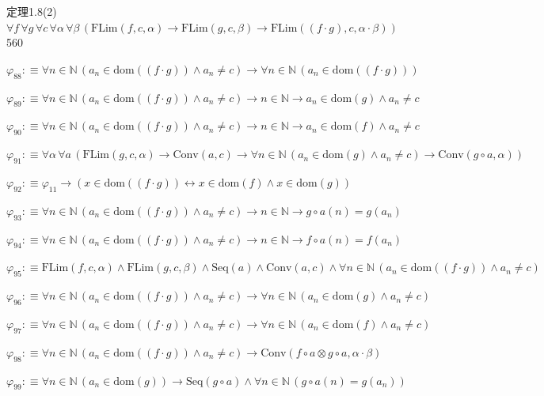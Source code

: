 \begin{fullproof}{定理1.8(2)}{$\forall f\,\forall g\,\forall c\,\forall \alpha\,\forall \beta\,(\mathrm{FLim}(f,c,\alpha) \to \mathrm{FLim}(g,c,\beta) \to \mathrm{FLim}((f \cdot g),c,\alpha \cdot \beta))$}{560}
\begin{abbrevlist}
\item $\varphi_{88} :\equiv \forall n \in \mathbb{N}\,(a_{n} \in \mathrm{dom}((f \cdot g)) \land a_{n} \neq c) \to \forall n \in \mathbb{N}\,(a_{n} \in \mathrm{dom}((f \cdot g)))$
\item $\varphi_{89} :\equiv \forall n \in \mathbb{N}\,(a_{n} \in \mathrm{dom}((f \cdot g)) \land a_{n} \neq c) \to n \in \mathbb{N} \to a_{n} \in \mathrm{dom}(g) \land a_{n} \neq c$
\item $\varphi_{90} :\equiv \forall n \in \mathbb{N}\,(a_{n} \in \mathrm{dom}((f \cdot g)) \land a_{n} \neq c) \to n \in \mathbb{N} \to a_{n} \in \mathrm{dom}(f) \land a_{n} \neq c$
\item $\varphi_{91} :\equiv \forall \alpha\,\forall a\,(\mathrm{FLim}(g,c,\alpha) \to \mathrm{Conv}(a,c) \to \forall n \in \mathbb{N}\,(a_{n} \in \mathrm{dom}(g) \land a_{n} \neq c) \to \mathrm{Conv}(g \circ a,\alpha))$
\item $\varphi_{92} :\equiv \varphi_{11} \to (x \in \mathrm{dom}((f \cdot g)) \leftrightarrow x \in \mathrm{dom}(f) \land x \in \mathrm{dom}(g))$
\item $\varphi_{93} :\equiv \forall n \in \mathbb{N}\,(a_{n} \in \mathrm{dom}((f \cdot g)) \land a_{n} \neq c) \to n \in \mathbb{N} \to g \circ a(n) = g(a_{n})$
\item $\varphi_{94} :\equiv \forall n \in \mathbb{N}\,(a_{n} \in \mathrm{dom}((f \cdot g)) \land a_{n} \neq c) \to n \in \mathbb{N} \to f \circ a(n) = f(a_{n})$
\item $\varphi_{95} :\equiv \mathrm{FLim}(f,c,\alpha) \land \mathrm{FLim}(g,c,\beta) \land \mathrm{Seq}(a) \land \mathrm{Conv}(a,c) \land \forall n \in \mathbb{N}\,(a_{n} \in \mathrm{dom}((f \cdot g)) \land a_{n} \neq c)$
\item $\varphi_{96} :\equiv \forall n \in \mathbb{N}\,(a_{n} \in \mathrm{dom}((f \cdot g)) \land a_{n} \neq c) \to \forall n \in \mathbb{N}\,(a_{n} \in \mathrm{dom}(g) \land a_{n} \neq c)$
\item $\varphi_{97} :\equiv \forall n \in \mathbb{N}\,(a_{n} \in \mathrm{dom}((f \cdot g)) \land a_{n} \neq c) \to \forall n \in \mathbb{N}\,(a_{n} \in \mathrm{dom}(f) \land a_{n} \neq c)$
\item $\varphi_{98} :\equiv \forall n \in \mathbb{N}\,(a_{n} \in \mathrm{dom}((f \cdot g)) \land a_{n} \neq c) \to \mathrm{Conv}(f \circ a \otimes g \circ a,\alpha \cdot \beta)$
\item $\varphi_{99} :\equiv \forall n \in \mathbb{N}\,(a_{n} \in \mathrm{dom}(g)) \to \mathrm{Seq}(g \circ a) \land \forall n \in \mathbb{N}\,(g \circ a(n) = g(a_{n}))$

\end{abbrevlist}
\end{fullproof}
